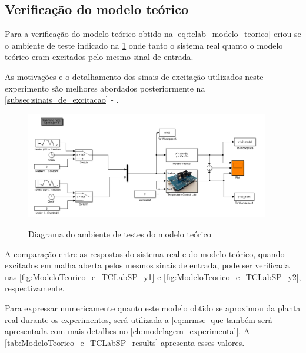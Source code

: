 \subsection{Verificação do modelo teórico}
\label{subsec:verificacao_do_modelo_teorico}

Para a verificação do modelo teórico obtido na \cref{eq:tclab_modelo_teorico} criou-se o ambiente de
teste indicado na \cref{fig:ModeloTeorico_e_TCLabSP_Simulink} onde tanto o sistema real quanto o modelo
teórico eram excitados pelo mesmo sinal de entrada.

As motivações e o detalhamento dos sinais de excitação utilizados neste experimento são melhores abordados
posteriormente na \cref{subsec:sinais_de_excitacao} - .

\begin{figure}[h]
	\caption{Diagrama do ambiente de testes do modelo teórico}
	\begin{center}
		\includegraphics[width=0.95\textwidth]{./5_images/ModeloTeorico_e_TCLabSP_Simulink.png} 
		\label{fig:ModeloTeorico_e_TCLabSP_Simulink}
	\end{center}
	\centering
\end{figure}

A comparação entre as respostas do sistema real e do modelo teórico, quando excitados em malha aberta pelos mesmos sinais
de entrada, pode ser verificada nas \cref{fig:ModeloTeorico_e_TCLabSP_y1} e \cref{fig:ModeloTeorico_e_TCLabSP_y2},
respectivamente.

Para expressar numericamente quanto este modelo obtido se aproximou da planta real durante os experimentos,
será utilizada a \cref{eq:nrmse} que também será apresentada com mais detalhes no \cref{ch:modelagem_experimental}.
A \cref{tab:ModeloTeorico_e_TCLabSP_results} apresenta esses valores.

